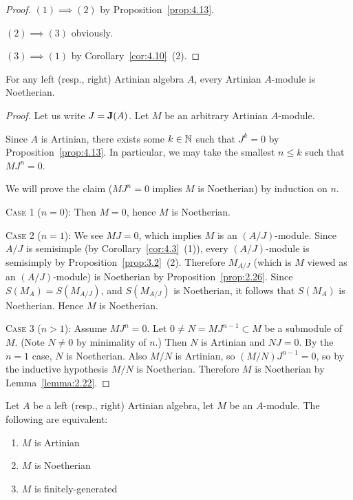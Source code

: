 \begin{proof}
$(1)\implies(2)$ by Proposition~\ref{prop:4.13}.

$(2)\implies(3)$ obviously.

$(3)\implies(1)$ by Corollary~\ref{cor:4.10}~(2).
\end{proof}

\begin{proposition}\label{prop:4.15}
For any left (resp., right) Artinian algebra $A$, every Artinian
$A$-module is Noetherian.
\end{proposition}

\begin{proof}
Let us write $J=\operatorname{\textup{\textbf{J}}}(A)$. Let $M$ be an arbitrary Artinian
$A$-module.

Since $A$ is Artinian, there exists
some $k\in\mathbb{N}$ such that $J^{k}=0$ by Proposition~\ref{prop:4.13}. In
particular, we may take the smallest $n\leq k$ such that $MJ^{n}=0$.

We will prove the claim ($MJ^{n}=0$ implies $M$ is Noetherian) by induction on $n$.

\textsc{Case 1} ($n=0$): Then $M=0$, hence $M$ is Noetherian.

\textsc{Case 2} ($n=1$): We see $MJ=0$, which implies $M$ is an
$(A/J)$-module. Since $A/J$ is semisimple (by Corollary~\ref{cor:4.3}~(1)),
every $(A/J)$-module is semisimply by Proposition~\ref{prop:3.2}~(2).
Therefore $M_{A/J}$ (which is $M$ viewed as an $(A/J)$-module) is
Noetherian by Proposition~\ref{prop:2.26}. Since $S(M_{A})=S(M_{A/J})$,
and $S(M_{A/J})$ is Noetherian, it follows that $S(M_{A})$ is
Noetherian. Hence $M$ is Noetherian.

\textsc{Case 3} ($n>1$): Assume $MJ^{n}=0$. Let $0\neq N=MJ^{n-1}\subset M$
be a submodule of $M$. (Note $N\neq0$ by minimality of $n$.) Then $N$
is Artinian and $NJ=0$. By the $n=1$ case, $N$ is Noetherian. Also
$M/N$ is Artinian, so $(M/N)J^{n-1}=0$, so by the inductive hypothesis
$M/N$ is Noetherian. Therefore $M$ is Noetherian by Lemma~\ref{lemma:2.22}.
\end{proof}

\begin{corollary}\label{cor:4.16}
Let $A$ be a left (resp., right) Artinian algebra, let $M$ be an
$A$-module. The following are equivalent:
\begin{enumerate}
\item $M$ is Artinian
\item $M$ is Noetherian
\item $M$ is finitely-generated
\end{enumerate}
\end{corollary}

